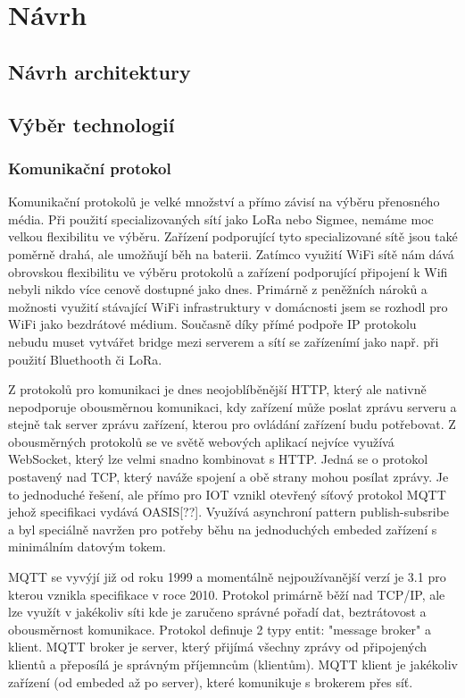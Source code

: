 \documentclass[thesis=B,czech]{FITthesis}[2019/12/23]
\begin{document}
\chapter{Návrh}

\section{Návrh architektury}

\section{Výběr technologií}

\subsection{Komunikační protokol}   %
Komunikační protokolů je velké množství a přímo závisí na výběru přenosného média. Při použití specializovaných sítí jako LoRa nebo Sigmee, nemáme moc velkou flexibilitu ve výběru. Zařízení podporující tyto specializované sítě jsou také poměrně drahá, ale umožňují běh na baterii. Zatímco využití WiFi sítě nám dává obrovskou flexibilitu ve výběru protokolů a zařízení podporující připojení k Wifi nebyli nikdo více cenově dostupné jako dnes. Primárně z peněžních nároků a možnosti využití stávající WiFi infrastruktury v domácnosti jsem se rozhodl pro WiFi jako bezdrátové médium. Současně díky přímé podpoře IP protokolu nebudu muset vytvářet bridge mezi serverem a sítí se zařízenímí jako např. při použití Bluethooth či LoRa.

Z protokolů pro komunikaci je dnes neojoblíběnější HTTP, který ale nativně nepodporuje obousměrnou komunikaci, kdy zařízení může poslat zprávu serveru a stejně tak server zprávu zařízení, kterou pro ovládání zařízení budu potřebovat. Z obousměrných protokolů se ve světě webových aplikací nejvíce využívá WebSocket, který lze velmi snadno kombinovat s HTTP. Jedná se o protokol postavený nad TCP, který naváže spojení a obě strany mohou posílat zprávy. Je to jednoduché řešení, ale přímo pro IOT vznikl otevřený síťový protokol MQTT jehož specifikaci vydává OASIS[??]. Využívá asynchroní pattern publish-subsribe a byl speciálně navržen pro potřeby běhu na jednoduchých embeded zařízení s minimálním datovým tokem.

MQTT se vyvýjí již od roku 1999 a momentálně nejpoužívanější verzí je 3.1 pro kterou vznikla specifikace v roce 2010. Protokol primárně běží nad TCP/IP, ale lze využít v jakékoliv síti kde je zaručeno správné pořadí dat, beztrátovost a obousměrnost komunikace. Protokol definuje 2 typy entit: "message broker" a klient. MQTT broker je server, který přijímá všechny zprávy od připojených klientů a přeposílá je správným příjemncům (klientům). MQTT klient je jakékoliv zařízení (od embeded až po server), které komunikuje s brokerem přes síť.
\end{document}
